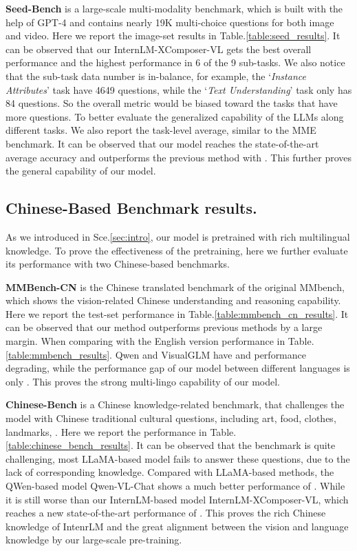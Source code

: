 \documentclass[10pt,twocolumn,letterpaper]{article}
\begin{document}
\noindent\textbf{Seed-Bench} is a large-scale multi-modality benchmark, which is built with the help of GPT-4 and contains nearly 19K multi-choice questions for both image and video. Here we report the image-set results in Table.\ref{table:seed_results}. It can be observed that our InternLM-XComposer-VL gets the best overall performance and the highest performance in 6 of the 9 sub-tasks. We also notice that the sub-task data number is in-balance, for example, the `\textit{Instance Attributes}' task have 4649 questions, while the `\textit{Text Understanding}' task only has 84 questions. So the overall metric would be biased toward the tasks that have more questions. To better evaluate the generalized capability of the LLMs along different tasks. We also report the task-level average, similar to the MME benchmark. It can be observed that our model reaches the state-of-the-art average accuracy and outperforms the previous method with . This further proves the general capability of our model.



\subsection{Chinese-Based Benchmark results.}
As we introduced in Sce.\ref{sec:intro}, our model is pretrained with rich multilingual knowledge. To prove the effectiveness of the pretraining, here we further evaluate its performance with two Chinese-based benchmarks.

\noindent\textbf{MMBench-CN} is the Chinese translated benchmark of the original MMbench, which shows the vision-related Chinese understanding and reasoning capability. 
Here we report the test-set performance in Table.\ref{table:mmbench_cn_results}. It can be observed that our method outperforms previous methods by a large margin. When comparing with the English version performance in Table.\ref{table:mmbench_results}. Qwen and VisualGLM have  and   performance degrading, while the performance gap of our model between different languages is only . This proves the strong multi-lingo capability of our model.

\noindent\textbf{Chinese-Bench} is a Chinese knowledge-related benchmark, that challenges the model with Chinese traditional cultural questions, including art, food, clothes, landmarks, \etc.  
Here we report the performance in Table.\ref{table:chinese_bench_results}. It can be observed that the benchmark is quite challenging, most LLaMA-based model fails to answer these questions, due to the lack of corresponding knowledge. Compared with LLaMA-based methods, the QWen-based model Qwen-VL-Chat shows a much better performance of . While it is still worse than our InternLM-based model InternLM-XComposer-VL, which reaches a new state-of-the-art performance of . This proves the rich Chinese knowledge of IntenrLM and the great alignment between the vision and language knowledge by our large-scale pre-training.
\end{document}
